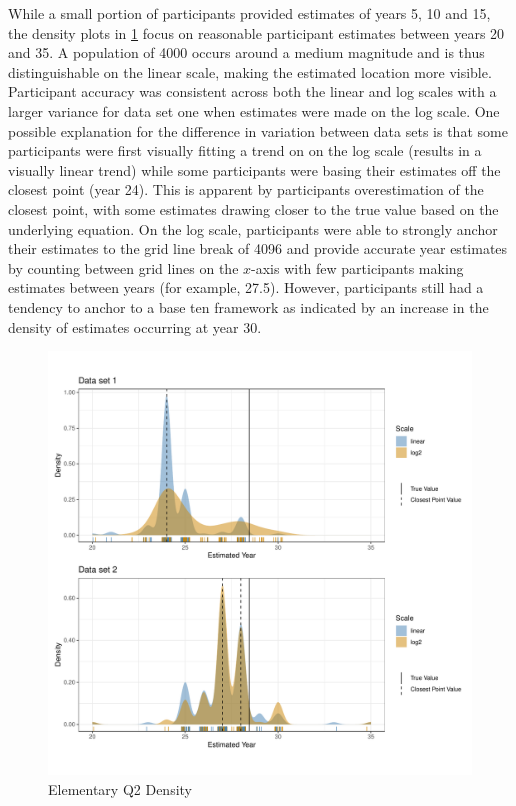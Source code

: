 \documentclass[print]{nuthesis}
\begin{document}
While a small portion of participants provided estimates of years 5, 10 and 15, the density plots in \cref{fig:qe2-density-plot} focus on reasonable participant estimates between years 20 and 35.
A population of 4000 occurs around a medium magnitude and is thus distinguishable on the linear scale, making the estimated location more visible.
Participant accuracy was consistent across both the linear and log scales with a larger variance for data set one when estimates were made on the log scale.
One possible explanation for the difference in variation between data sets is that some participants were first visually fitting a trend on on the log scale (results in a visually linear trend) while some participants were basing their estimates off the closest point (year 24).
This is apparent by participants overestimation of the closest point, with some estimates drawing closer to the true value based on the underlying equation.
On the log scale, participants were able to strongly anchor their estimates to the grid line break of 4096 and provide accurate year estimates by counting between grid lines on the \(x\)-axis with few participants making estimates between years (for example, 27.5).
However, participants still had a tendency to anchor to a base ten framework as indicated by an increase in the density of estimates occurring at year 30.

\begin{figure}[tbp]

{\centering \includegraphics[width=1\linewidth,]{thesis_files/figure-latex/qe2-density-plot-1} 

}

\caption{Elementary Q2 Density}\label{fig:qe2-density-plot}
\end{figure}
\end{document}
